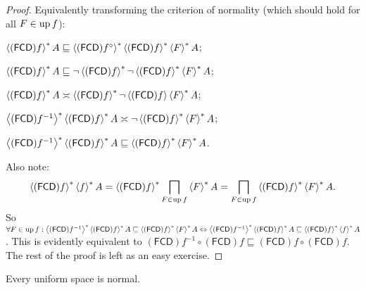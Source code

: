 \begin{proof}
  Equivalently transforming the criterion of normality (which should hold for
  all $F \in \up f$):
  
  $\rsupfun{(\mathsf{FCD}) f} A \sqsubseteq
  \rsupfun{(\mathsf{FCD}) f^{\circ}}
  \rsupfun{(\mathsf{FCD}) f} \rsupfun{F} A$;
  
  $\rsupfun{(\mathsf{FCD}) f} A \sqsubseteq \neg
  \rsupfun{(\mathsf{FCD}) f} \neg \rsupfun{ (\mathsf{FCD}) f }
  \rsupfun{F} A$;
  
  $\rsupfun{(\mathsf{FCD}) f} A \asymp
  \rsupfun{(\mathsf{FCD}) f} \neg \supfun{(\mathsf{FCD}) f} \rsupfun{F} A$;
  
  $\rsupfun{(\mathsf{FCD}) f^{- 1}}
  \rsupfun{(\mathsf{FCD}) f} A \asymp \neg
  \rsupfun{(\mathsf{FCD}) f} \rsupfun{F} A$;
  
  $\rsupfun{(\mathsf{FCD}) f^{- 1}}
  \rsupfun{(\mathsf{FCD}) f} A \sqsubseteq
  \rsupfun{(\mathsf{FCD}) f} \rsupfun{F} A$.
  
  Also note:
  \[ \rsupfun{(\mathsf{FCD}) f} \rsupfun{f} A
     = \rsupfun{(\mathsf{FCD}) f} \bigsqcap_{F \in
     \up f} \rsupfun{F} A = \bigsqcap_{F \in \up f}
     \rsupfun{(\mathsf{FCD}) f} \rsupfun{F}
     A. \]
  So $\forall F \in \up f : \rsupfun{ (\mathsf{FCD}) f^{- 1}
  } \rsupfun{(\mathsf{FCD}) f} A \sqsubseteq
  \rsupfun{(\mathsf{FCD}) f} \rsupfun{F} A
  \Leftrightarrow \rsupfun{(\mathsf{FCD}) f^{- 1}}
  \rsupfun{(\mathsf{FCD}) f} A \sqsubseteq
  \rsupfun{(\mathsf{FCD}) f} \rsupfun{f} A$. This is
  evidently equivalent to $(\mathsf{FCD}) f^{- 1} \circ
  (\mathsf{FCD}) f \sqsubseteq (\mathsf{FCD}) f \circ
  (\mathsf{FCD}) f$. The rest of the proof is left as an easy exercise.
\end{proof}

\begin{cor}
  Every uniform space is normal.
\end{cor}